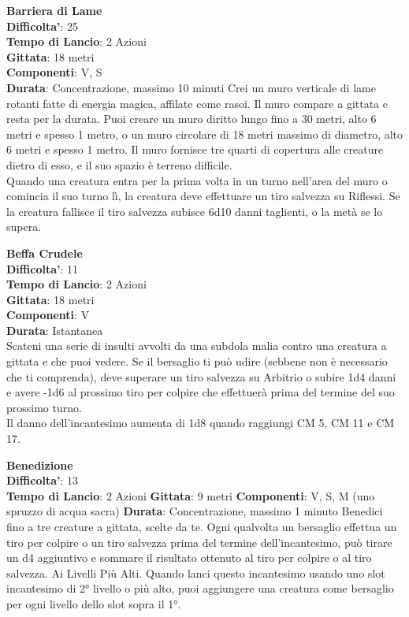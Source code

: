 \begin{multicols}{2}
\medskip\textbf{Barriera di Lame}\\
\textbf{Difficolta'}: 25\\
\textbf{Tempo di Lancio}: 2 Azioni\\
\textbf{Gittata}: 18 metri\\
\textbf{Componenti}: V, S\\
\textbf{Durata}: Concentrazione, massimo 10 minuti Crei un muro verticale di lame rotanti fatte di energia magica, affilate come rasoi. Il muro compare a gittata e resta per la durata. Puoi creare un muro diritto lungo fino a 30 metri, alto 6 metri e spesso 1 metro, o un muro circolare di 18 metri massimo di diametro, alto 6 metri e spesso 1 metro. Il muro fornisce tre quarti di copertura alle creature dietro di esso, e il suo spazio è terreno difficile. \\
Quando una creatura entra per la prima volta in un turno nell’area del muro o comincia il suo turno lì, la creatura deve effettuare un tiro salvezza su Riflessi. Se la creatura fallisce il tiro salvezza subisce 6d10 danni taglienti, o la metà se lo supera.

\medskip\textbf{Beffa Crudele}\\
\textbf{Difficolta'}: 11\\
\textbf{Tempo di Lancio}: 2 Azioni\\
\textbf{Gittata}: 18 metri\\
\textbf{Componenti}: V\\
\textbf{Durata}: Istantanea\\
Scateni una serie di insulti avvolti da una subdola malia contro una creatura a gittata e che puoi vedere. Se il bersaglio ti può udire (sebbene non è necessario che ti comprenda), deve superare un tiro salvezza su Arbitrio o subire 1d4 danni e avere -1d6 al prossimo tiro per colpire che effettuerà prima del termine del suo prossimo turno.\\
Il danno dell’incantesimo aumenta di 1d8 quando raggiungi CM 5, CM 11 e CM 17.

\medskip\textbf{Benedizione}\\
\textbf{Difficolta'}: 13\\
\textbf{Tempo di Lancio}: 2 Azioni
\textbf{Gittata}: 9 metri
\textbf{Componenti}: V, S, M (uno spruzzo di acqua sacra)
\textbf{Durata}: Concentrazione, massimo 1 minuto
Benedici fino a tre creature a gittata, scelte da te. Ogni
qualvolta un bersaglio effettua un tiro per colpire o un
tiro salvezza prima del termine dell’incantesimo, può
tirare un d4 aggiuntivo e sommare il risultato ottenuto al
tiro per colpire o al tiro salvezza.
Ai Livelli Più Alti. Quando lanci questo incantesimo
usando uno slot incantesimo di 2° livello o più alto, puoi
aggiungere una creatura come bersaglio per ogni livello
dello slot sopra il 1°.



\end{multicols}
